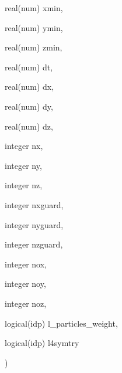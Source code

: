 {\begin{DoxyParamCaption}
\item[{real(num)}]{xmin, }
\item[{real(num)}]{ymin, }
\item[{real(num)}]{zmin, }
\item[{real(num)}]{dt, }
\item[{real(num)}]{dx, }
\item[{real(num)}]{dy, }
\item[{real(num)}]{dz, }
\item[{integer}]{nx, }
\item[{integer}]{ny, }
\item[{integer}]{nz, }
\item[{integer}]{nxguard, }
\item[{integer}]{nyguard, }
\item[{integer}]{nzguard, }
\item[{integer}]{nox, }
\item[{integer}]{noy, }
\item[{integer}]{noz, }
\item[{logical(idp)}]{l\+\_\+particles\+\_\+weight, }
\item[{logical(idp)}]{l4symtry}
\end{DoxyParamCaption}
)}\hypertarget{current__deposition_8_f90_a764fd99e306237a96ae8675235ca96bb}{}\label{current__deposition_8_f90_a764fd99e306237a96ae8675235ca96bb}
